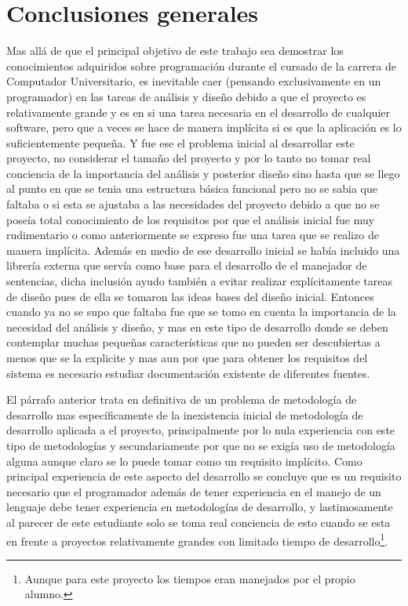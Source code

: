 \section{Conclusiones generales}    
%
Mas allá de que el principal objetivo de este trabajo sea demostrar los conocimientos adquiridos sobre programación durante el cursado de la carrera de Computador Universitario, es inevitable caer (pensando exclusivamente en un programador) en las tareas de análisis y diseño debido a que el proyecto es relativamente grande y es en si una tarea necesaria en el desarrollo de cualquier software, pero que a veces se hace de manera implícita si es que la aplicación es lo suficientemente pequeña. Y fue ese el problema inicial al desarrollar este proyecto, no considerar el tamaño del proyecto y por lo tanto no tomar real conciencia de la importancia del análisis y posterior diseño sino hasta que se llego al punto en que se tenia una estructura básica funcional pero no se sabia que faltaba o si esta se ajustaba a las necesidades del proyecto debido a que no se poseía total conocimiento de los requisitos por que el análisis inicial fue muy rudimentario o como anteriormente se expreso fue una tarea que se realizo de manera implícita. Además en medio de ese desarrollo inicial se había incluido una librería externa que servía como base para el desarrollo de el manejador de sentencias, dicha inclusión ayudo también a evitar realizar explícitamente tareas de diseño pues de ella se tomaron las ideas bases del diseño inicial. Entonces cuando ya no se supo que faltaba fue que se tomo en cuenta la importancia de la necesidad del análisis y diseño, y mas en este tipo de desarrollo donde se deben contemplar muchas pequeñas características que no pueden ser descubiertas a menos que se la explicite y mas aun por que para obtener los requisitos del sistema es necesario estudiar documentación existente de diferentes fuentes.

El párrafo anterior trata en definitiva de un problema de metodología de desarrollo mas específicamente de la inexistencia inicial de metodología de desarrollo aplicada a el proyecto, principalmente por lo nula experiencia con este tipo de metodologías y secundariamente por que no se exigía uso de metodología alguna aunque claro se lo puede tomar como un requisito implícito. Como principal experiencia de este aspecto del desarrollo se concluye que es un requisito necesario que el programador además de tener experiencia en el manejo de un lenguaje debe tener experiencia en metodologías de desarrollo, y lastimosamente al parecer de este estudiante solo se toma real conciencia de esto cuando se esta en frente a proyectos relativamente grandes con limitado tiempo de desarrollo\footnote{Aunque para este proyecto los tiempos eran manejados por el propio alumno.}.

